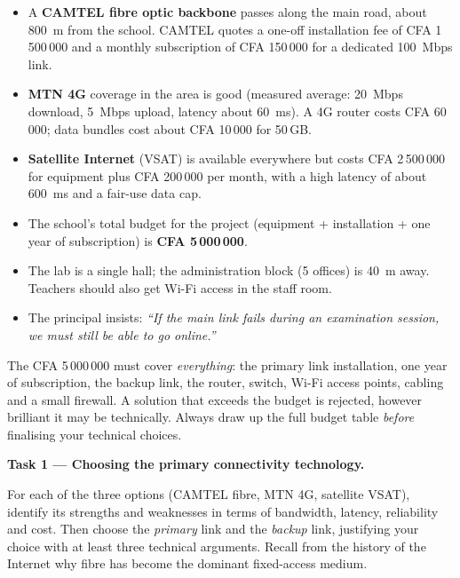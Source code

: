 \documentclass[11pt]{article}
\newcounter{popsec}
\newcounter{popsub}
\newcommand{\courssub}[1]{%
  \stepcounter{popsub}%
  \par\vspace{9pt}\noindent{\popxbold\fontsize{11.5}{13}\selectfont\color{popink}{\color{poporange}\thepopsec.\thepopsub}\hspace{6pt}#1}\par\nopagebreak\vspace{4pt}
}
\begin{document}
\begin{itemize}
\item A \textbf{CAMTEL fibre optic backbone} passes along the main road, about \SI{800}{m} from the school. CAMTEL quotes a one-off installation fee of CFA 1\,500\,000 and a monthly subscription of CFA 150\,000 for a dedicated \SI{100}{Mbps} link.
\item \textbf{MTN 4G} coverage in the area is good (measured average: \SI{20}{Mbps} download, \SI{5}{Mbps} upload, latency about \SI{60}{ms}). A 4G router costs CFA 60\,000; data bundles cost about CFA 10\,000 for 50\,GB.
\item \textbf{Satellite Internet} (VSAT) is available everywhere but costs CFA 2\,500\,000 for equipment plus CFA 200\,000 per month, with a high latency of about \SI{600}{ms} and a fair-use data cap.
\item The school's total budget for the project (equipment + installation + one year of subscription) is \textbf{CFA 5\,000\,000}.
\item The lab is a single hall; the administration block (5 offices) is \SI{40}{m} away. Teachers should also get Wi-Fi access in the staff room.
\item The principal insists: \emph{``If the main link fails during an examination session, we must still be able to go online.''}
\end{itemize}

\begin{attention}
The CFA 5\,000\,000 must cover \emph{everything}: the primary link installation, one year of subscription, the backup link, the router, switch, Wi-Fi access points, cabling and a small firewall. A solution that exceeds the budget is rejected, however brilliant it may be technically. Always draw up the full budget table \emph{before} finalising your technical choices.
\end{attention}

\courssub{Tasks}

\textbf{Task 1 — Choosing the primary connectivity technology.}\par
For each of the three options (CAMTEL fibre, MTN 4G, satellite VSAT), identify its strengths and weaknesses in terms of bandwidth, latency, reliability and cost. Then choose the \emph{primary} link and the \emph{backup} link, justifying your choice with at least three technical arguments. Recall from the history of the Internet why fibre has become the dominant fixed-access medium.
\end{document}
